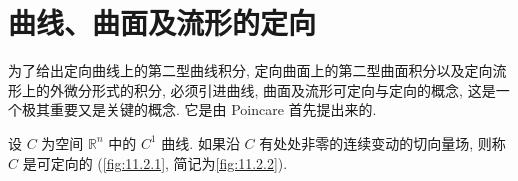 \section{曲线、曲面及流形的定向}

为了给出定向曲线上的第二型曲线积分, 定向曲面上的第二型曲面积分以及定向流形上的外微分形式的积分, 必须引进曲线, 曲面及流形可定向与定向的概念, 这是一个极其重要又是关键的概念. 它是由 Poincare 首先提出来的.

\begin{definition}\label{def:11.2.1}
设 $C$ 为空间 $\mathbb{R}^{n}$ 中的 $C^{1}$ 曲线. 如果沿 $C$ 有处处非零的连续变动的切向量场, 则称 $C$ 是可定向的 (\cref{fig:11.2.1}, 简记为\cref{fig:11.2.2}).
\end{definition}

